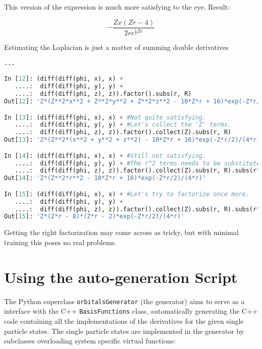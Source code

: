 This version of the expression is much more satisfying to the eye. Result:

\begin{equation*}
 - \frac{Z x \left(Z r -4\right)}{2 r e^{\frac{1}{2} Z r}}
\end{equation*}

Estimating the Laplacian is just a matter of summing double derivatives

\begin{lstlisting}[language=Python]
...

In [12]: (diff(diff(phi, x), x) + 
   ....:  diff(diff(phi, y), y) + 
   ....:  diff(diff(phi, z), z)).factor().subs(r, R)
Out[12]: 'Z*(Z**2*x**2 + Z**2*y**2 + Z**2*z**2 - 10*Z*r + 16)*exp(-Z*r/2)/(4*r)'

In [13]: (diff(diff(phi, x), x) + #Not quite satisfying.
   ....:  diff(diff(phi, y), y) + #Let's collect the 'Z' terms.
   ....:  diff(diff(phi, z), z)).factor().collect(Z).subs(r, R)
Out[13]: 'Z*(Z**2*(x**2 + y**2 + z**2) - 10*Z*r + 16)*exp(-Z*r/2)/(4*r)'

In [14]: (diff(diff(phi, x), x) + #Still not satisfying.
   ....:  diff(diff(phi, y), y) + #The r^2 terms needs to be substituted as well.
   ....:  diff(diff(phi, z), z)).factor().collect(Z).subs(r, R).subs(r**2, R**2)
Out[14]: 'Z*(Z**2*r**2 - 10*Z*r + 16)*exp(-Z*r/2)/(4*r)'

In [15]: (diff(diff(phi, x), x) + #Let's try to factorize once more.
   ....:  diff(diff(phi, y), y) + 
   ....:  diff(diff(phi, z), z)).factor().collect(Z).subs(r, R).subs(r**2, R**2).factor()
Out[15]: 'Z*(Z*r - 8)*(Z*r - 2)*exp(-Z*r/2)/(4*r)'

\end{lstlisting}

Getting the right factorization may come across as tricky, but with minimal training this poses no real problems.

\section{Using the auto-generation Script}

The Python superclass \verb+orbitalsGenerator+ (the generator) aims to serve as a interface with the C++ \verb+BasisFunctions+ class, automatically generating the C++ code containing all the implementations of the derivatives for the given single particle states. The single particle states are implemented in the generator by subclasses overloading system specific virtual functions:

